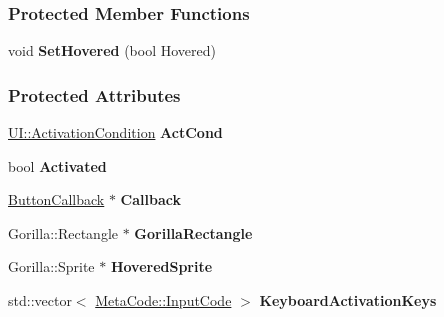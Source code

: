 \subsubsection*{Protected Member Functions}
\begin{DoxyCompactItemize}
\item 
\hypertarget{classMezzanine_1_1UI_1_1Button_acd58ff783face0390389e840879fb8fb}{
void {\bfseries SetHovered} (bool Hovered)}
\label{classMezzanine_1_1UI_1_1Button_acd58ff783face0390389e840879fb8fb}

\end{DoxyCompactItemize}
\subsubsection*{Protected Attributes}
\begin{DoxyCompactItemize}
\item 
\hypertarget{classMezzanine_1_1UI_1_1Button_ab8ec63546baad2c3fe73833c55185026}{
\hyperlink{namespaceMezzanine_1_1UI_aca58497951b1b9c7da10f214da3392f0}{UI::ActivationCondition} {\bfseries ActCond}}
\label{classMezzanine_1_1UI_1_1Button_ab8ec63546baad2c3fe73833c55185026}

\item 
\hypertarget{classMezzanine_1_1UI_1_1Button_a0e48b926861702094676ea5d329933fb}{
bool {\bfseries Activated}}
\label{classMezzanine_1_1UI_1_1Button_a0e48b926861702094676ea5d329933fb}

\item 
\hypertarget{classMezzanine_1_1UI_1_1Button_a2aafa20c1e6ff918cbe6374b773f5320}{
\hyperlink{classMezzanine_1_1UI_1_1ButtonCallback}{ButtonCallback} $\ast$ {\bfseries Callback}}
\label{classMezzanine_1_1UI_1_1Button_a2aafa20c1e6ff918cbe6374b773f5320}

\item 
\hypertarget{classMezzanine_1_1UI_1_1Button_ae0c01f2585a9bfd95466c81caab6cda1}{
Gorilla::Rectangle $\ast$ {\bfseries GorillaRectangle}}
\label{classMezzanine_1_1UI_1_1Button_ae0c01f2585a9bfd95466c81caab6cda1}

\item 
\hypertarget{classMezzanine_1_1UI_1_1Button_a7725a08b53f43045a38b61ce57945db1}{
Gorilla::Sprite $\ast$ {\bfseries HoveredSprite}}
\label{classMezzanine_1_1UI_1_1Button_a7725a08b53f43045a38b61ce57945db1}

\item 
\hypertarget{classMezzanine_1_1UI_1_1Button_a3fc77631f527f820b3ee2f00a5be50f1}{
std::vector$<$ \hyperlink{classMezzanine_1_1MetaCode_a3b5633f0145bf3287cf53a3f05b5563c}{MetaCode::InputCode} $>$ {\bfseries KeyboardActivationKeys}}
\label{classMezzanine_1_1UI_1_1Button_a3fc77631f527f820b3ee2f00a5be50f1}


\end{DoxyCompactItemize}
